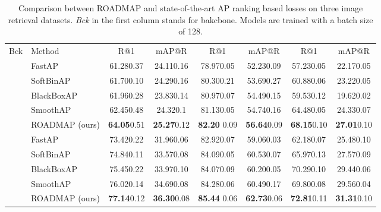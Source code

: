 \begin{table}[h!]
    \caption{Comparison between ROADMAP and state-of-the-art AP ranking based losses on three image retrieval datasets. \textit{Bck} in the first column stands for bakcbone. Models are trained with a batch size of 128.}
    \setlength\tabcolsep{3pt}
    \label{tab:compa_ranking_losses_sup} 
    \centering
    \begin{tabularx}{\textwidth}{>{\small} l>{\small} l >{\small}c>{\small}c >{\small}c>{\small}c >{\small}c >{\small}c }
        \toprule
         && \multicolumn{2}{c}{CUB} & \multicolumn{2}{c}{SOP} & \multicolumn{2}{c}{INaturalist} \\
         \midrule
         Bck & Method & R@1 & mAP@R & R@1 & mAP@R & R@1 & mAP@R \\
         \midrule
         \multirow{5}{*}{\rotatebox[origin=c]{90}{ResNet-50}}
         & FastAP \cite{fastap} & 61.280.37 & 24.110.16 & 78.970.05 & 52.230.09 & 57.230.05 & 22.170.05 \\
         & SoftBinAP \cite{naverap} & 61.700.10 & 24.290.16 & 80.300.21 & 53.690.27 & 60.880.06 & 23.220.05 \\
         & BlackBoxAP \cite{blackboxap} & 61.960.28 & 23.830.14 & 80.970.07 & 54.490.15 & 59.530.12 & 19.620.02 \\
         & SmoothAP \cite{smoothap} & 62.450.48 & 24.320.1 & 81.130.05 & 54.740.16 & 64.480.05 & 24.330.07 \\
         & ROADMAP (ours) & \textbf{64.05}0.51 & \textbf{25.27}0.12 & \textbf{82.20} 0.09 & \textbf{56.64}0.09 & \textbf{68.15}0.10 & \textbf{27.01}0.10 \\
         \midrule
         \multirow{5}{*}{\rotatebox[origin=c]{90}{DeiT}}
         & FastAP \cite{fastap} & 73.420.22 & 31.960.06 & 82.920.07 & 59.060.03 & 62.180.07 & 25.480.10 \\
         & SoftBinAP \cite{naverap} & 74.840.11 & 33.570.08 & 84.090.05 & 60.530.07 & 65.970.13 & 27.570.09 \\
         & BlackBoxAP \cite{blackboxap} & 75.450.22 & 33.970.10 & 84.070.09 & 60.200.05 & 70.290.10 & 29.440.06 \\
         & SmoothAP \cite{smoothap} & 76.020.14 & 34.690.08 & 84.280.06 & 60.490.17 & 69.800.08 & 29.560.04 \\
         & ROADMAP (ours) & \textbf{77.14}0.12 & \textbf{36.30}0.08 & \textbf{85.44} 0.06 & \textbf{62.73}0.06 & \textbf{72.81}0.11 & \textbf{31.31}0.10 \\
         \bottomrule
    \end{tabularx}
\end{table}

